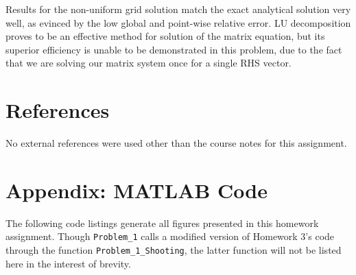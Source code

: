 \documentclass[11pt]{article}
\begin{document}
Results for the non-uniform grid solution match the exact analytical solution very well, as evinced by the low global and point-wise relative error. LU decomposition proves to be an effective method for solution of the matrix equation, but its superior efficiency is unable to be demonstrated in this problem, due to the fact that we are solving our matrix system once for a single RHS vector.

\section{References} %

No external references were used other than the course notes for this assignment.

\section*{Appendix: MATLAB Code} %

The following code listings generate all figures presented in this homework assignment. Though \lstinline|Problem_1| calls a modified version of Homework 3's code through the function \lstinline|Problem_1_Shooting|, the latter function will not be listed here in the interest of brevity.


\end{document}
